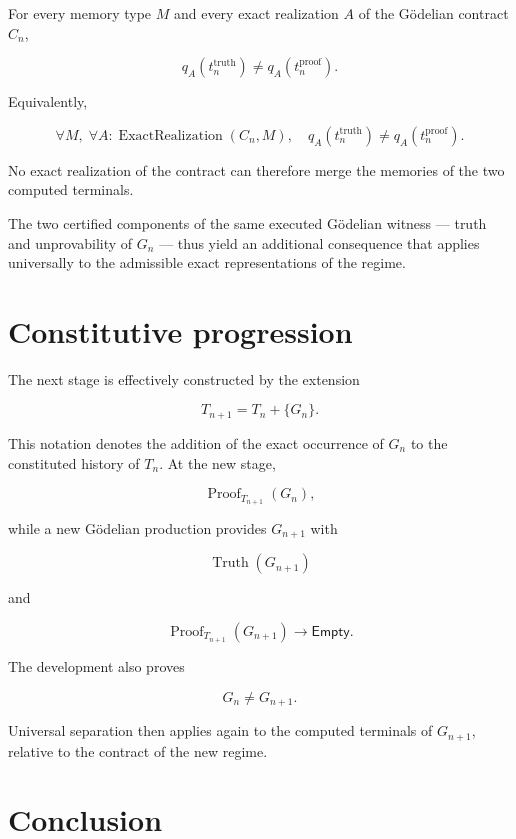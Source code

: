 \documentclass[11pt,a4paper]{article}
\newcommand{\Truth}{\operatorname{Truth}}
\newcommand{\Proof}{\operatorname{Proof}}
\newcommand{\ExactRealization}{\operatorname{ExactRealization}}
\newcommand{\Empty}{\mathsf{Empty}}
\begin{document}
For every memory type $M$ and every exact realization $A$ of the Gödelian
contract $C_n$,

\[
  \boxed{
    q_A\!\left(t^{\mathrm{truth}}_n\right)
    \neq
    q_A\!\left(t^{\mathrm{proof}}_n\right)
  }.
\]

Equivalently,

\[
  \boxed{
    \forall M,\;
    \forall A : \ExactRealization(C_n,M),\quad
    q_A\!\left(t^{\mathrm{truth}}_n\right)
    \neq
    q_A\!\left(t^{\mathrm{proof}}_n\right)
  }.
\]

No exact realization of the contract can therefore merge the memories of the
two computed terminals.

The two certified components of the same executed Gödelian witness --- truth
and unprovability of $G_n$ --- thus yield an additional consequence that
applies universally to the admissible exact representations of the regime.

\section{Constitutive progression}

The next stage is effectively constructed by the extension

\[
  T_{n+1} = T_n + \{G_n\}.
\]

This notation denotes the addition of the exact occurrence of $G_n$ to the
constituted history of $T_n$. At the new stage,

\[
  \Proof_{T_{n+1}}(G_n),
\]

while a new Gödelian production provides $G_{n+1}$ with

\[
  \Truth(G_{n+1})
\]

and

\[
  \Proof_{T_{n+1}}(G_{n+1}) \longrightarrow \Empty.
\]

The development also proves

\[
  G_n \neq G_{n+1}.
\]

Universal separation then applies again to the computed terminals of
$G_{n+1}$, relative to the contract of the new regime.

\section{Conclusion}

\begin{center}
\end{center}
\end{document}
